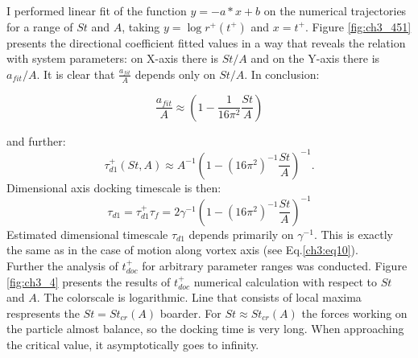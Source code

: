 \documentclass[../main.tex]{subfiles}
\begin{document}
I performed linear fit of the function $y=-a*x +b$ on the numerical trajectories for a range of $St$ and $A$, taking $y=\log r^+(t^+)$ and $x=t^+$. Figure \ref{fig:ch3_451} presents the directional coefficient fitted values in a way that reveals the relation with system parameters: on X-axis there is $St/A$ and on the Y-axis there is $a_{fit}/A$. It is clear that $\frac{a_{fit}}{A}$ depends only on $St/A$. In conclusion:

\begin{equation}
\frac{a_{fit}}{A} \approx \left(1-\frac{1}{16 \pi^2}\frac{St}{A}\right)
\label{ch3:eq22b}
\end{equation}

and further:
\begin{equation}
\tau^+_{d1}(St,A)\approx A^{-1}\left(1-(16 \pi^2)^{-1}\frac{St}{A}\right)^{-1}.
\label{ch3:eq22c}
\end{equation}
Dimensional axis docking timescale is then:
\begin{equation}
\tau_{d1} = \tau^+_{d1} \tau_f=2 \gamma^{-1} \left(1-(16 \pi^2)^{-1}\frac{St}{A}\right)^{-1}
\label{ch3:eq26}
\end{equation}
Estimated dimensional timescale $\tau_{d1}$ depends primarily on $\gamma^{-1}$. This is exactly the same as in the case of motion along vortex axis (see Eq.\ref{ch3:eq10}).\\

%
%
%

Further the analysis of $t^+_{doc}$ for arbitrary parameter ranges was conducted. Figure \ref{fig:ch3_4} presents the results of $t^+_{doc}$ numerical calculation with respect to $St$ and $A$. The colorscale is logarithmic. Line that consists of local maxima respresents the $St=St_{cr}(A)$ boarder. For $St\approx St_{cr}(A)$ the forces working on the particle almost balance, so the docking time is very long. When approaching the critical value, it asymptotically goes to infinity.
\end{document}
